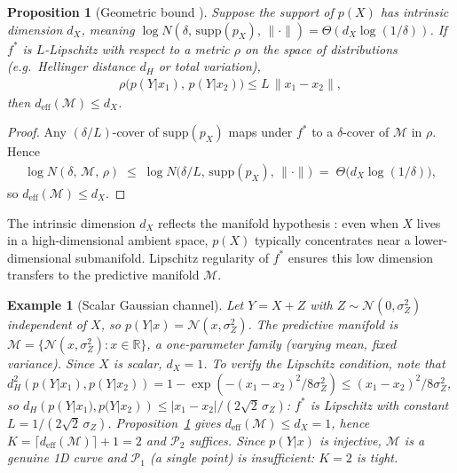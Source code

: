 \documentclass[11pt]{article}
\newtheorem{proposition}{Proposition}
\newtheorem{example}{Example}
\begin{document}
\begin{proposition}[Geometric bound {\cite[\S 3.2]{falconer2003fractal}}]
\label{prop:geom_dim}
Suppose the support of $p(X)$ has intrinsic dimension $d_X$, meaning
$\log N(\delta,\,\mathrm{supp}(p_X),\,\|\cdot\|)
= \Theta(d_X\log(1/\delta))$.
If $f^*$ is $L$-Lipschitz with respect to a metric $\rho$ on the space
of distributions (e.g.\ Hellinger distance $d_H$ or total variation),
\begin{align}
    \rho\bigl(p(Y|x_1),\,p(Y|x_2)\bigr)
    \leq L\,\|x_1-x_2\|,
\end{align}
then $d_{\mathrm{eff}}(\mathcal{M})\leq d_X$.
\end{proposition}

\begin{proof}
Any $(\delta/L)$-cover of $\mathrm{supp}(p_X)$ maps under $f^*$ to a
$\delta$-cover of $\mathcal{M}$ in $\rho$.
Hence
\begin{align}
    \log N(\delta,\,\mathcal{M},\,\rho)
    \;\leq\;
    \log N\!\bigl(\delta/L,\,\mathrm{supp}(p_X),\,\|\cdot\|\bigr)
    \;=\;
    \Theta\!\bigl(d_X\log(1/\delta)\bigr),
\end{align}
so $d_{\mathrm{eff}}(\mathcal{M})\leq d_X$.
\end{proof}

The intrinsic dimension $d_X$ reflects the manifold hypothesis
\cite{fefferman2016testing,pope2021intrinsic}: even when $X$ lives in a
high-dimensional ambient space, $p(X)$ typically concentrates near a
lower-dimensional submanifold.
Lipschitz regularity of $f^*$ ensures this low dimension transfers to
the predictive manifold $\mathcal{M}$.

\begin{example}[Scalar Gaussian channel]
Let $Y=X+Z$ with $Z\sim\mathcal{N}(0,\sigma_Z^2)$ independent of $X$,
so $p(Y|x)=\mathcal{N}(x,\sigma_Z^2)$.
The predictive manifold is
$\mathcal{M}=\{\mathcal{N}(x,\sigma_Z^2):x\in\mathbb{R}\}$,
a one-parameter family (varying mean, fixed variance).
Since $X$ is scalar, $d_X=1$.
To verify the Lipschitz condition, note that
$d_H^2(p(Y|x_1),p(Y|x_2))=1-\exp(-(x_1{-}x_2)^2/8\sigma_Z^2)
\leq(x_1{-}x_2)^2/8\sigma_Z^2$,
so $d_H(p(Y|x_1),p(Y|x_2))\leq|x_1{-}x_2|/(2\sqrt{2}\,\sigma_Z)$:
$f^*$ is Lipschitz with constant $L=1/(2\sqrt{2}\,\sigma_Z)$.
Proposition~\ref{prop:geom_dim} gives $d_{\mathrm{eff}}(\mathcal{M})\leq d_X=1$,
hence $K=\lceil d_{\mathrm{eff}}(\mathcal{M})\rceil+1=2$ and $\mathcal{P}_2$ suffices.
Since $p(Y|x)$ is injective, $\mathcal{M}$ is a genuine 1D curve and
$\mathcal{P}_1$ (a single point) is insufficient: $K=2$ is tight.
\end{example}
\end{document}
